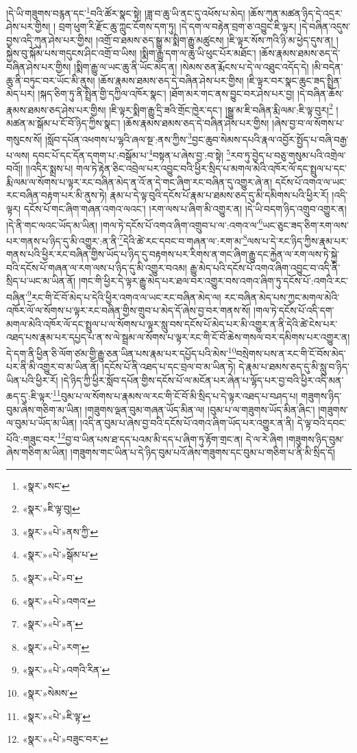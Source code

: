 །དེ་ཡི་གཟུགས་བརྙན་དང་\footnote{«སྣར་»སང་}བའི་ཚོར་སྣང་སྟེ། །ཟླ་བ་ཆུ་ཡི་ནང་དུ་འཕོས་པ་མེད། །ཆོས་ཀུན་མཚན་ཉིད་དེ་འདྲར་ཤེས་པར་གྱིས། །
བྲག་ཕུག་རི་རྫོང་ཆུ་ཀླུང་ངོགས་དག་ཏུ། །དེ་དག་ལ་བརྟེན་བྲག་ཅ་འབྱུང་ཇི་ལྟར། །དེ་བཞིན་འདུས་བྱས་འདི་ཀུན་ཤེས་པར་གྱིས། །འགྲོ་བ་ཐམས་ཅད་སྒྱུ་མ་སྨིག་རྒྱུ་མཚུངས། །ཇི་ལྟར་སོས་ཀའི་ཉི་མ་ཕྱེད་དུས་ན། །སྐྱེས་བུ་སྐོམ་པས་གདུངས་ཤིང་འགྲོ་བ་ཡིས། །སྨིག་རྒྱུ་དག་ལ་ཆུ་ཡི་ཕུང་པོར་མཐོང་། །ཆོས་རྣམས་ཐམས་ཅད་དེ་བཞིན་ཤེས་པར་གྱིས། །སྨིག་རྒྱུ་ལ་ཡང་ཆུ་ནི་ཡོང་མེད་ན། །སེམས་ཅན་རྨོངས་པ་དེ་ལ་འཐུང་འདོད་དེ། །མི་བདེན་ཆུ་ནི་བཏུང་བར་ཡོང་མི་ནུས། །ཆོས་རྣམས་ཐམས་ཅད་དེ་བཞིན་ཤེས་པར་གྱིས། །ཇི་ལྟར་བར་སྣང་ཆུང་ཟད་སྤྲིན་མེད་པར། །སྐད་ཅིག་ཏུ་ནི་སྤྲིན་གྱི་དཀྱིལ་འཁོར་སྣང་། །ཐོག་མར་གང་ནས་བྱུང་བར་ཤེས་པར་བྱ། །དེ་བཞིན་ཆོས་རྣམས་ཐམས་ཅད་ཤེས་པར་གྱིས། །ཇི་ལྟར་སྨིག་རྒྱུ་དྲི་ཟའི་གྲོང་ཁྱེར་དང་། །སྒྱུ་མ་ཇི་བཞིན་རྨི་ལམ་:ཇི་ལྟ་བུར།\footnote{«སྣར་»ཇི་ལྟ་བུ།} །མཚན་མ་སྒོམ་པ་ངོ་བོ་ཉིད་ཀྱིས་སྣང་། །ཆོས་རྣམས་ཐམས་ཅད་དེ་བཞིན་ཤེས་པར་གྱིས། །ཞེས་བྱ་བ་ལ་སོགས་པ་གསུངས་སོ། །སློབ་དཔོན་འཕགས་པ་ལྷའི་ཞལ་སྔ་:ནས་ཀྱིས་\footnote{«སྣར་»«པེ་»ནས་ཀྱི་}བྱང་ཆུབ་སེམས་དཔའི་རྣལ་འབྱོར་སྤྱོད་པ་བཞི་བརྒྱ་པ་ལས། དབང་པོ་དང་དོན་དགག་པ་:བསྒོམ་པ་\footnote{«སྣར་»«པེ་»སྒོམ་པ་}བསྟན་པ་ཞེས་བྱ་:བ་སྟེ། \footnote{«སྣར་»«པེ་»བ་}རབ་ཏུ་བྱེད་པ་བཅུ་གསུམ་པའི་འགྲེལ་བའོ།། །།འདིར་སྨྲས་པ། གལ་ཏེ་རྟེན་ཅིང་འབྲེལ་པར་འབྱུང་བའི་ཕྱིར་སྲིད་པ་མགལ་མེའི་འཁོར་ལོ་དང་སྤྲུལ་པ་དང་རྨི་ལམ་ལ་སོགས་པ་ལྟར་རང་བཞིན་མེད་ན་འོ་ན་དེ་གང་ཞིག་རང་བཞིན་དུ་འགྱུར་ཞེ་ན། དངོས་པོ་འགའ་ལ་ཡང་རང་བཞིན་བརྟག་པར་མི་ནུས་ཏེ། རྣམ་པ་དེ་ལྟ་བུའི་དངོས་པོ་རྣམ་པ་ཐམས་ཅད་དུ་མི་དམིགས་པའི་ཕྱིར་རོ། །འདི་ལྟར། དངོས་པོ་གང་ཞིག་གཞན་འགའ་ལའང་། །རག་ལས་པ་ཞིག་མི་འགྱུར་ན། །དེ་ཡི་བདག་ཉིད་འགྲུབ་འགྱུར་ན། །དེ་ནི་གང་ལའང་ཡོད་མ་ཡིན། །གལ་ཏེ་དངོས་པོ་འགའ་ཞིག་འགྲུབ་པ་ལ་:འགའ་ལ་\footnote{«སྣར་»«པེ་»འགའ་}ཡང་ཅུང་ཟད་ཅིག་རག་ལས་པར་གནས་པ་ཉིད་དུ་མི་འགྱུར་:ན་ནི་\footnote{«སྣར་»«པེ་»ན་}དེའི་ཚེ་རང་དབང་བ་གཞན་ལ་:རག་མ་\footnote{«སྣར་»«པེ་»རག་}ལས་པ་དེ་རང་ཉིད་ཀྱིས་རྣམ་པར་གནས་པའི་ཕྱིར་རང་བཞིན་གྱིས་ཡོད་པ་ཉིད་དུ་བརྟགས་པར་རིགས་ན་གང་ཞིག་རྒྱུ་དང་རྐྱེན་ལ་རག་ལས་ཏེ་སྐྱེ་བའི་དངོས་པོ་གཞན་ལ་རག་ལས་པ་ཉིད་དུ་མི་འགྱུར་བའམ། རྒྱུ་མེད་པའི་དངོས་པོ་འགའ་ཞིག་འབྱུང་བ་འདི་ནི་སྲིད་པ་ཡང་མ་ཡིན་ནོ། །གང་གི་ཕྱིར་དེ་ལྟར་རྒྱུ་མེད་པར་ཐལ་བར་འགྱུར་བས་འགའ་ཞིག་ཏུ་དངོས་པོ་:འགའི་རང་བཞིན་\footnote{«སྣར་»«པེ་»འགའི་རིན་}རང་གི་ངོ་བོ་མེད་པ་དེའི་ཕྱིར་འགའ་ལ་ཡང་རང་བཞིན་མེད་ལ། རང་བཞིན་མེད་པས་ཀྱང་མགལ་མེའི་འཁོར་ལོ་ལ་སོགས་པ་ལྟར་རང་བཞིན་གྱིས་གྲུབ་པ་མེད་དོ་ཞེས་བྱ་བར་གནས་སོ། །གལ་ཏེ་དངོས་པོ་འདི་དག་མགལ་མེའི་འཁོར་ལོ་དང་སྤྲུལ་པ་ལ་སོགས་པ་ལྟར་སླུ་བས་དངོས་པོ་མེད་པར་མི་འགྱུར་ན་ནི་དེའི་ཚེ་ངེས་པར་འཐད་པས་རྣམ་པར་དཔྱད་པ་ན་ས་ལེ་སྦྲམ་ལ་སོགས་པ་ལྟར་རང་གི་ངོ་བོ་ཆེས་གསལ་བར་དམིགས་པར་འགྱུར་ན། དེ་དག་ནི་ཕྱིན་ཅི་ལོག་ཙམ་གྱི་རྒྱུ་ཅན་ཡིན་པས་རྣམ་པར་དཔྱོད་པའི་མེས་\footnote{«སྣར་»སེམས་}བསྲེགས་པས་ན་རང་གི་ངོ་བོས་མེད་པར་ནི་མི་འགྱུར་བ་མ་ཡིན་ནོ། །དངོས་པོ་ནི་འཐད་པ་དང་བྲལ་བ་མ་ཡིན་ཏེ། དེ་རྣམ་པ་ཐམས་ཅད་དུ་མི་སླུ་བ་ཉིད་ཡིན་པའི་ཕྱིར་རོ། །དེ་ཉིད་ཀྱི་ཕྱིར་སློབ་དཔོན་གྱིས་དངོས་པོ་ལ་མངོན་པར་ཞེན་པ་ལྷོད་པར་བྱ་བའི་ཕྱིར་འདི་མན་ཆད་དུ་:ཇི་ལྟར་\footnote{«སྣར་»«པེ་»ཇི་ལྟ་}བུམ་པ་ལ་སོགས་པ་རྣམས་ལ་རང་གི་ངོ་བོ་མི་སྲིད་པ་དེ་ལྟར་འཐད་པ་བཤད་པ། གཟུགས་ཉིད་བུམ་ཞེས་གཅིག་མ་ཡིན། །གཟུགས་ལྡན་བུམ་གཞན་ཡོད་མིན་ལ། །བུམ་པ་ལ་གཟུགས་ཡོད་མིན་ཞིང་། །གཟུགས་ལ་བུམ་པ་ཡོད་མ་ཡིན། །འདི་ན་བུམ་པ་ཞེས་བྱ་བའི་དངོས་པོ་འགའ་ཞིག་ཡོད་པར་འགྱུར་ན་ནི། དེ་ལྟ་བའི་དབང་པོའི་:གཟུང་བར་\footnote{«སྣར་»«པེ་»བཟུང་བར་}བྱ་བ་ཡིན་པས་ཐ་དད་པའམ་མི་དད་པ་ཞིག་ཏུ་རྟོག་གྲང་ན། དེ་ལ་རེ་ཞིག །གཟུགས་ཉིད་བུམ་ཞེས་གཅིག་མ་ཡིན། །གཟུགས་གང་ཡིན་པ་དེ་ཉིད་བུམ་པའོ་ཞེས་གཟུགས་དང་བུམ་པ་གཅིག་པ་ནི་མི་སྲིད་དོ། 